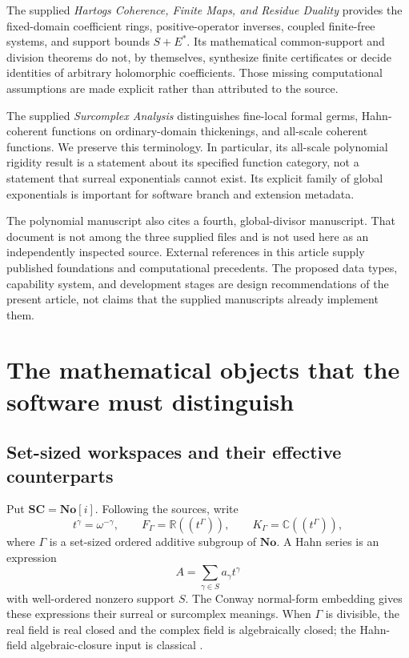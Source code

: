\documentclass[11pt,letterpaper]{article}
\numberwithin{equation}{section}
\theoremstyle{definition}
\theoremstyle{remark}\newtheorem{remark}[theorem]{Remark}
\newcommand{\No}{\mathbf{No}}
\newcommand{\SC}{\mathbf{SC}}
\newcommand{\R}{\mathbb R}
\newcommand{\C}{\mathbb C}
\begin{document}
The supplied \emph{Hartogs Coherence, Finite Maps, and Residue Duality}
\cite{SourceResearch} provides the fixed-domain coefficient rings,
positive-operator inverses, coupled finite-free systems, and support bounds
$S+E^*$. Its mathematical common-support and division theorems do not, by
themselves, synthesize finite certificates or decide identities of arbitrary
holomorphic coefficients. Those missing computational assumptions are made
explicit rather than attributed to the source.

The supplied \emph{Surcomplex Analysis} \cite{SourceAnalysis} distinguishes
fine-local formal germs, Hahn-coherent functions on ordinary-domain
thickenings, and all-scale coherent functions. We preserve this terminology.
In particular, its all-scale polynomial rigidity result is a statement about
its specified function category, not a statement that surreal exponentials
cannot exist. Its explicit family of global exponentials is important for
software branch and extension metadata.

The polynomial manuscript also cites a fourth, global-divisor manuscript.
That document is not among the three supplied files and is not used here as
an independently inspected source. External references in this article supply
published foundations and computational precedents. The proposed data types,
capability system, and development stages are design recommendations of the
present article, not claims that the supplied manuscripts already implement them.

\section{The mathematical objects that the software must distinguish}
\label{sec:objects}

\subsection{Set-sized workspaces and their effective counterparts}
Put $\SC=\No[i]$. Following the sources, write
\[
 t^\gamma=\omega^{-\gamma},\qquad
 F_\Gamma=\R((t^\Gamma)),\qquad K_\Gamma=\C((t^\Gamma)),
\]
where $\Gamma$ is a set-sized ordered additive subgroup of $\No$. A Hahn series
is an expression
\begin{equation}\label{eq:hahn}
 A=\sum_{\gamma\in S}a_\gamma t^\gamma
\end{equation}
with well-ordered nonzero support $S$. The Conway normal-form embedding gives
these expressions their surreal or surcomplex meanings. When $\Gamma$ is
divisible, the real field is real closed and the complex field is algebraically
closed; the Hahn-field algebraic-closure input is classical
\cite{Poonen,SourcePolynomial}.
\end{document}
